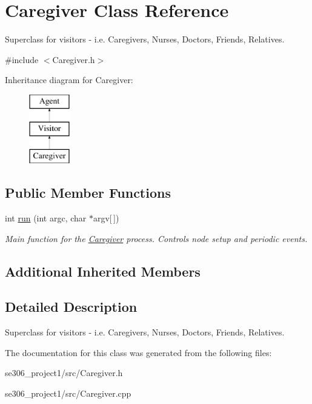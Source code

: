 \hypertarget{classCaregiver}{\section{Caregiver Class Reference}
\label{classCaregiver}
}


Superclass for visitors -\/ i.\-e. Caregivers, Nurses, Doctors, Friends, Relatives.  




{\ttfamily \#include $<$Caregiver.\-h$>$}

Inheritance diagram for Caregiver\-:\begin{figure}[H]
\begin{center}
\leavevmode
\includegraphics[height=3.000000cm]{classCaregiver}
\end{center}
\end{figure}
\subsection*{Public Member Functions}
\begin{DoxyCompactItemize}
\item 
\hypertarget{classCaregiver_a8d1eccbe63af5842970daa69fedb40cc}{int \hyperlink{classCaregiver_a8d1eccbe63af5842970daa69fedb40cc}{run} (int argc, char $\ast$argv\mbox{[}$\,$\mbox{]})}\label{classCaregiver_a8d1eccbe63af5842970daa69fedb40cc}

\begin{DoxyCompactList}\small\item\em Main function for the \hyperlink{classCaregiver}{Caregiver} process. Controls node setup and periodic events. \end{DoxyCompactList}\end{DoxyCompactItemize}
\subsection*{Additional Inherited Members}


\subsection{Detailed Description}
Superclass for visitors -\/ i.\-e. Caregivers, Nurses, Doctors, Friends, Relatives. 

The documentation for this class was generated from the following files\-:\begin{DoxyCompactItemize}
\item 
se306\-\_\-project1/src/Caregiver.\-h\item 
se306\-\_\-project1/src/Caregiver.\-cpp\end{DoxyCompactItemize}
